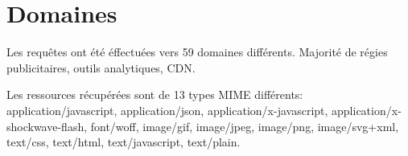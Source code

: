 \documentclass[a4paper,11pt,final]{article}
\begin{document}
  \section{Domaines}

  Les requêtes ont été éffectuées vers 59 domaines différents.
  Majorité de régies publicitaires, outils analytiques, CDN.

  Les ressources récupérées sont de 13 types MIME différents: application/javascript, application/json, application/x-javascript, application/x-shockwave-flash, font/woff, image/gif, image/jpeg, image/png, image/svg+xml, text/css, text/html, text/javascript, text/plain. 
\end{document}
